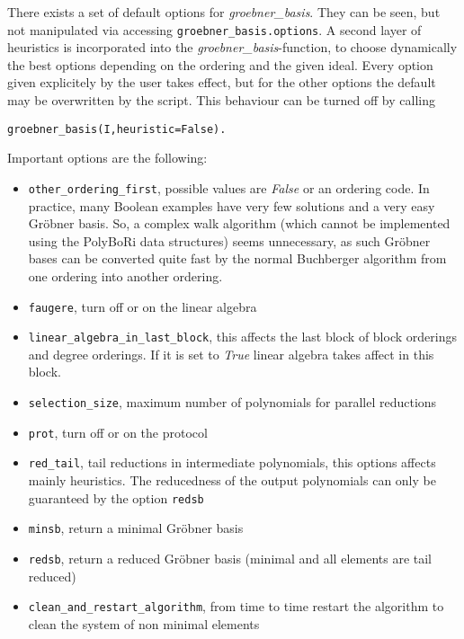 \documentclass[]{article}
\newcommand{\PolyBoRi}{{\sc PolyBoRi}\xspace}
\newcommand{\Groebner}{Gr\"{o}bner\xspace}
\newcommand{\functionname}[1]{\textit{#1}\xspace}
\newcommand{\pythonconstant}[1]{\textit{#1}\xspace}
\newcounter{thm}
\begin{document}
There exists a set of default options for \functionname{groebner\_basis}.
They can be seen, but not manipulated via accessing \lstinline|groebner_basis.options|.
A second layer of heuristics is incorporated into the \functionname{groebner\_basis}-function, to choose dynamically the best options depending on the ordering and the given ideal.
Every option given explicitely by the user takes effect, but for the other options the default may be overwritten by the script.
This behaviour can be turned off by calling
\begin{lstlisting}
groebner_basis(I,heuristic=False).
\end{lstlisting}

Important options are the following:
\begin{itemize}
    \item \lstinline|other_ordering_first|, possible values are \pythonconstant{False} or an ordering code.
    In practice, many Boolean examples have very few solutions and a very easy \Groebner basis. So, a complex walk algorithm (which cannot be implemented using the \PolyBoRi data structures) seems unnecessary, as such \Groebner bases can be converted quite fast by the 
    normal Buchberger algorithm from one ordering into another ordering.
    \item \lstinline|faugere|, turn off or on the linear algebra
    \item \lstinline|linear_algebra_in_last_block|, this affects the last block of block orderings and degree orderings. If it is set to \pythonconstant{True} linear algebra takes affect in this block.
    \item \lstinline|selection_size|, maximum number of polynomials for parallel reductions
    \item \lstinline|prot|, turn off or on the protocol
    \item \lstinline|red_tail|, tail reductions in intermediate polynomials, this options affects mainly heuristics. The reducedness of the output polynomials can only be guaranteed by the option \lstinline|redsb|
    \item \lstinline|minsb|, return a minimal \Groebner basis
    \item \lstinline|redsb|, return a reduced \Groebner basis (minimal and all elements are tail reduced)
    \item \lstinline|clean_and_restart_algorithm|, from time to time restart the algorithm to clean the system of non minimal elements
\end{itemize}
\end{document}
